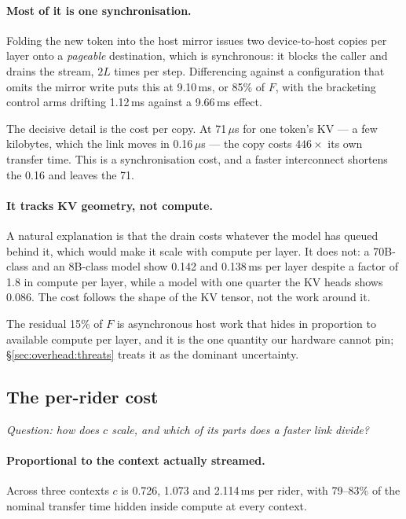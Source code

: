 \paragraph{Most of it is one synchronisation.} Folding the new token into the
host mirror issues two device-to-host copies per layer onto a \emph{pageable}
destination, which is synchronous: it blocks the caller and drains the stream,
$2L$ times per step. Differencing against a configuration that omits the mirror
write puts this at 9.10\,ms, or 85\% of $F$, with the bracketing control arms
drifting 1.12\,ms against a 9.66\,ms effect.

The decisive detail is the cost per copy. At 71\,$\mu$s for one token's KV ---
a few kilobytes, which the link moves in 0.16\,$\mu$s --- the copy costs
$446\times$ its own transfer time. This is a synchronisation cost, and a faster
interconnect shortens the 0.16 and leaves the 71.

\paragraph{It tracks KV geometry, not compute.} A natural explanation is that
the drain costs whatever the model has queued behind it, which would make it
scale with compute per layer. It does not: a 70B-class and an 8B-class model
show 0.142 and 0.138\,ms per layer despite a factor of 1.8 in compute per layer,
while a model with one quarter the KV heads shows 0.086.
The cost follows the shape of the KV tensor, not the work around it.

The residual 15\% of $F$ is asynchronous host work that hides in proportion to
available compute per layer, and it is the one quantity our hardware cannot
pin; \S\ref{sec:overhead:threats} treats it as the dominant uncertainty.

\subsection{The per-rider cost}
\label{sec:overhead:c}

\emph{Question: how does $c$ scale, and which of its parts does a faster link
divide?}

\paragraph{Proportional to the context actually streamed.} Across three
contexts $c$ is 0.726, 1.073 and 2.114\,ms per rider, with 79--83\% of the
nominal transfer time hidden inside compute at every context.


